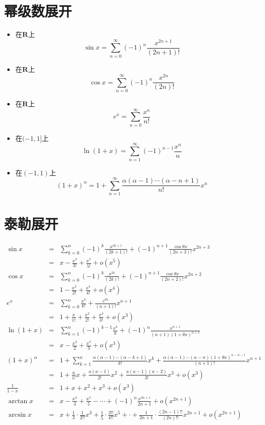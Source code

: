 \documentclass[UTF8]{ctexart}
\begin{document}
\section{幂级数展开}
\begin{itemize}
\item 在$\mathbf{R}$上
\[
\sin x =\sum_{n=0}^\infty (-1)^n \frac{x^{2n+1}}{(2n+1)!}
\]

\item 在$\mathbf{R}$上
\[
\cos x =\sum_{n=0}^\infty (-1)^n \frac{x^{2n}}{(2n)!}
\]

\item 在$\mathbf{R}$上
\[
e^x=\sum_{n=0}^\infty \frac{x^n}{n!}
\]

\item 在$(-1,1]$上
\[
\ln(1+x)=\sum_{n=1}^\infty (-1)^{n-1}\frac{x^n}{n}
\]

\item 在$(-1,1)$上
\[
(1+x)^\alpha = 1+ \sum_{n=1}^\infty \frac{\alpha(\alpha-1)\cdots(\alpha-n+1)}{n!}x^n
\]
\end{itemize}

\section{泰勒展开}
\begin{eqnarray*}
\sin x &=&\sum_{k=0}^n (-1)^k \frac{x^{2k+1}}{(2k+1)!}+(-1)^{n+1} \frac{\cos\theta x}{(2n+3)!} x^{2n+3}\\
&=& x-\frac{x^3}{3!}+\frac{x^5}{5!}+o(x^5)\\
\cos x &=&\sum_{k=0}^n (-1)^k \frac{x^{2k}}{(2k)!} + (-1)^{n+1} \frac{\cos\theta x}{(2n+2)!}x^{2n+2}\\
&=& 1-\frac{x^2}{2!}+\frac{x^4}{4!}+o(x^4)\\
e^x&=&\sum_{k=0}^n \frac{x^k}{k!}+\frac{e^{\theta x}}{(n+1)!}x^{n+1}\\
&=& 1+\frac{x}{1!}+\frac{x^2}{2!}+\frac{x^3}{3!}+o(x^3)\\
\ln(1+x)&=&\sum_{k=1}^n (-1)^{k-1}\frac{x^k}{k}+(-1)^n\frac{x^{n+1}}{(n+1)(1+\theta x)^{n+1}}\\
&=& x-\frac{x^2}{2}+\frac{x^3}{3}+o(x^3)\\
(1+x)^\alpha &=& 1+ \sum_{k=1}^n \frac{\alpha(\alpha-1)\cdots(\alpha-k+1)}{k!}x^k+\frac{\alpha(\alpha-1)\cdots(\alpha-n)(1+\theta x)^{\alpha-n-1}}{(n+1)!}x^{n+1}\\
&=& 1+\frac{a}{1!}x+\frac{a(a-1)}{2!}x^2+\frac{a(a-1)(a-2)}{3!}x^3+o(x^3)\\
\frac{1}{1-x} &=& 1+x+x^2+x^3+o(x^3)\\
\arctan x &=& x-\frac{x^3}{3}+\frac{x^5}{5}-\cdots+(-1)^n\frac{x^{2n+1}}{2n+1}+o(x^{2n+1})\\
\arcsin x &=& x+\frac{1}{3}\cdot\frac{1}{2!!}x^3+\frac{1}{5}\cdot\frac{3!!}{4!!}x^5+\cdot+\frac{1}{2n+1}\cdot\frac{(2n-1)!!}{(2n)!!}x^{2n+1}+o(x^{2n+1})
\end{eqnarray*}
\end{document}
